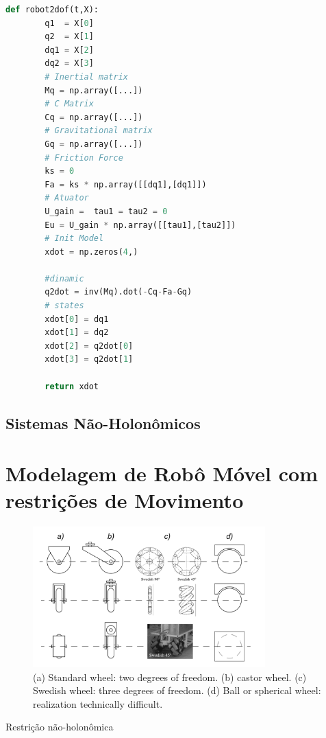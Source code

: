 \begin{lstlisting}[language=Python]
    def robot2dof(t,X):
        q1  = X[0]
        q2  = X[1]
        dq1 = X[2] 
        dq2 = X[3]
        # Inertial matrix
        Mq = np.array([...]) 
        # C Matrix
        Cq = np.array([...])
        # Gravitational matrix 
        Gq = np.array([...])
        # Friction Force
        ks = 0
        Fa = ks * np.array([[dq1],[dq1]])
        # Atuator
        U_gain =  tau1 = tau2 = 0
        Eu = U_gain * np.array([[tau1],[tau2]])
        # Init Model
        xdot = np.zeros(4,)
        
        #dinamic
        q2dot = inv(Mq).dot(-Cq-Fa-Gq)
        # states
        xdot[0] = dq1
        xdot[1] = dq2
        xdot[2] = q2dot[0]
        xdot[3] = q2dot[1]

        return xdot
\end{lstlisting}

\subsection{Sistemas Não-Holonômicos}


\section{Modelagem de Robô Móvel com restrições de Movimento}


\begin{figure}
    \includegraphics[width=0.8\textwidth]{chapters/chapter1/figures/tipo_de_rodas.png}
    \caption{ (a) Standard wheel: two degrees of freedom. (b) castor wheel. (c) Swedish wheel: three degrees of freedom. (d) Ball or spherical wheel: realization technically difficult.}
\end{figure}


 Restrição não-holonômica

